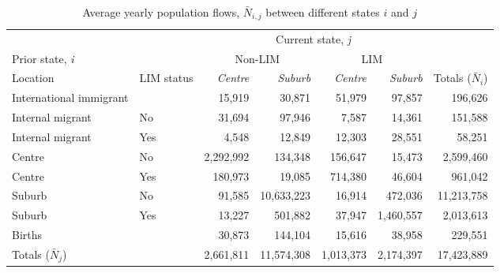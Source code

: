 \begin{table}[h]
	\small
	\centering
	\caption{Average yearly population flows, $\bar{N}_{i,j}$ between different states $i$ and $j$}
	\label{table:nij}
	\begin{tabular}{llrrrrr}
		\hline 
		\multicolumn{2}{c}{}                        & \multicolumn{4}{c}{Current state, \textit{j}}   &               \\
		\multicolumn{2}{l}{Prior state, \textit{i}}          & \multicolumn{2}{c}{Non-LIM} & \multicolumn{2}{c}{LIM}  & \\ 
		Location                  & LIM status      & \textit{Centre}       & \textit{Suburb}       & \textit{Centre}      & \textit{Suburb}  & Totals ($\bar{N}_i$)  \\ \hline
		
		
		International immigrant &  & 15,919    & 30,871     & 51,979    & 97,857    & 196,626    \\
		Internal migrant           & No           & 31,694    & 97,946     & 7,587     & 14,361    & 151,588    \\
		Internal migrant           & Yes          & 4,548     & 12,849     & 12,303    & 28,551    & 58,251     \\
		Centre                       & No           & 2,292,992 & 134,348    & 156,647   & 15,473    & 2,599,460  \\
		Centre                       & Yes          & 180,973   & 19,085     & 714,380   & 46,604    & 961,042    \\
		Suburb                       & No           & 91,585    & 10,633,223 & 16,914    & 472,036   & 11,213,758 \\
		Suburb                       & Yes          & 13,227    & 501,882    & 37,947    & 1,460,557 & 2,013,613  \\
		\multicolumn{2}{l}{Births}                  & 30,873    & 144,104    & 15,616    & 38,958    & 229,551    \\
		Totals ($\bar{N}_j$)                      &              & 2,661,811 & 11,574,308 & 1,013,373 & 2,174,397 & 17,423,889 \\ \hline
	\end{tabular}
\end{table}